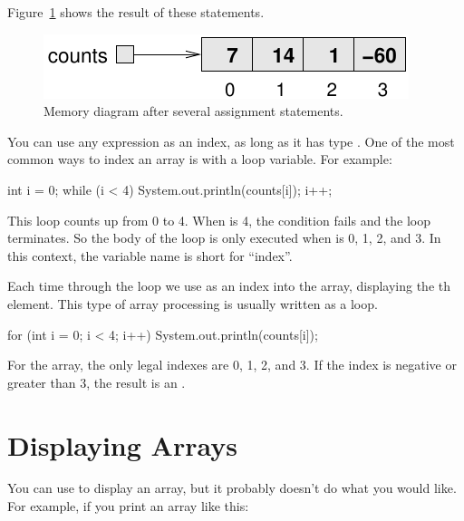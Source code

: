 Figure~\ref{fig.array2} shows the result of these statements.

\begin{figure}[!ht]
\begin{center}
\includegraphics{figs/array2.pdf}
\caption{Memory diagram after several assignment statements.}
\label{fig.array2}
\end{center}
\end{figure}

You can use any expression as an index, as long as it has type .
One of the most common ways to index an array is with a loop variable.
For example:

\begin{code}
int i = 0;
while (i < 4) {
    System.out.println(counts[i]);
    i++;
}
\end{code}

This  loop counts up from 0 to 4.
When  is 4, the condition fails and the loop terminates.
So the body of the loop is only executed when  is 0, 1, 2, and 3.
In this context, the variable name  is short for ``index''.


Each time through the loop we use  as an index into the array, displaying the th element.
This type of array processing is usually written as a  loop.

\begin{code}
for (int i = 0; i < 4; i++) {
    System.out.println(counts[i]);
}
\end{code}


For the  array, the only legal indexes are 0, 1, 2, and 3.
If the index is negative or greater than 3, the result is an .


\section{Displaying Arrays}
\label{printarray}


You can use  to display an array, but it probably doesn't do what you would like.
For example, if you print an array like this:

